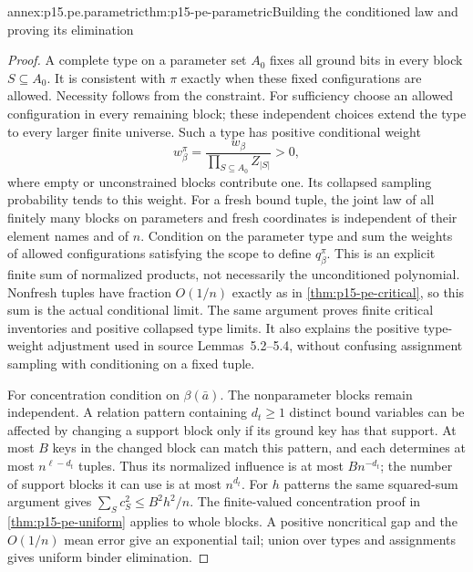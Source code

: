 \begin{annexitem}{annex:p15.pe.parametric}{thm:p15-pe-parametric}{Building the conditioned law and proving its elimination}
\begin{proof}
A complete type on a parameter set \(A_0\) fixes all ground bits in
every block \(S\subseteq A_0\). It is consistent with \(\pi\) exactly
when these fixed configurations are allowed. Necessity follows from
the constraint. For sufficiency choose an allowed configuration in
every remaining block; these independent choices extend the type to
every larger finite universe. Such a type has positive conditional
weight
\[
  w_\beta^\pi=
       \frac{w_\beta}{\prod_{S\subseteq A_0}Z_{|S|}}>0,
\]
where empty or unconstrained blocks contribute one. Its collapsed
sampling probability tends to this weight. For a fresh bound tuple,
the joint law of all finitely many blocks on parameters and fresh
coordinates is independent of their element names and of \(n\).
Condition on the parameter type and sum the weights of allowed
configurations satisfying the scope to define \(q_\beta^\pi\).
This is an explicit finite sum of normalized products, not necessarily
the unconditioned polynomial. Nonfresh tuples have fraction \(O(1/n)\)
exactly as in \cref{thm:p15-pe-critical}, so this sum is the actual
conditional limit. The same argument proves finite critical inventories
and positive collapsed type limits. It also explains the positive
type-weight adjustment used in source Lemmas~5.2--5.4, without
confusing assignment sampling with conditioning on a fixed tuple.

For concentration condition on \(\beta(\bar a)\). The nonparameter
blocks remain independent. A relation pattern containing \(d_t\ge1\)
distinct bound variables can be affected by changing a support block
only if its ground key has that support. At most \(B\) keys in the
changed block can match this pattern, and each determines at most
\(n^{\ell-d_t}\) tuples. Thus its normalized influence is at most
\(B n^{-d_t}\); the number of support blocks it can use is at most
\(n^{d_t}\). For \(h\) patterns the same squared-sum argument gives
\(\sum_S c_S^2\le B^2h^2/n\).
The finite-valued concentration proof in
\cref{thm:p15-pe-uniform} applies to whole blocks. A positive
noncritical gap and the \(O(1/n)\) mean error give an exponential tail;
union over types and assignments gives uniform binder elimination.


\end{proof}
\end{annexitem}
